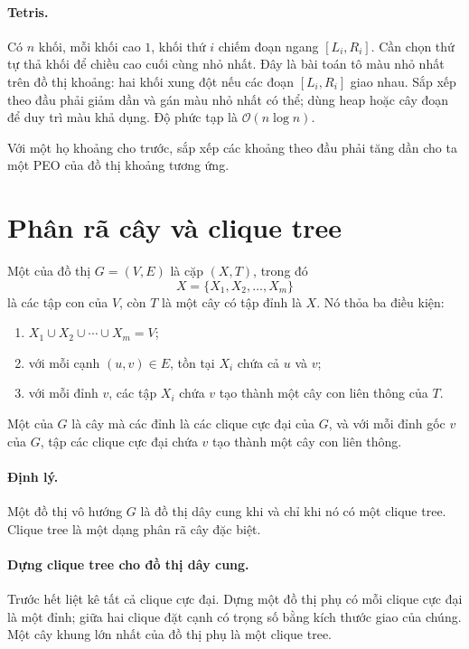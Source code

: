 \documentclass[11pt]{article}
\newcommand{\Oh}{\mathcal{O}}
\begin{document}
\paragraph{Tetris.}
Có \(n\) khối, mỗi khối cao \(1\), khối thứ \(i\) chiếm đoạn ngang
\([L_i,R_i]\). Cần chọn thứ tự thả khối để chiều cao cuối cùng nhỏ nhất. Đây
là bài toán tô màu nhỏ nhất trên đồ thị khoảng: hai khối xung đột nếu các
đoạn \([L_i,R_i]\) giao nhau. Sắp xếp theo đầu phải giảm dần và gán màu nhỏ
nhất có thể; dùng heap hoặc cây đoạn để duy trì màu khả dụng. Độ phức tạp là
\(\Oh(n\log n)\).

Với một họ khoảng cho trước, sắp xếp các khoảng theo đầu phải tăng dần cho ta
một PEO của đồ thị khoảng tương ứng.

\section{Phân rã cây và clique tree}

Một  của đồ thị \(G=(V,E)\) là cặp \((X,T)\), trong đó
\[
  X=\{X_1,X_2,\ldots,X_m\}
\]
là các tập con của \(V\), còn \(T\) là một cây có tập đỉnh là \(X\). Nó thỏa
ba điều kiện:
\begin{enumerate}
  \item \(X_1\cup X_2\cup\cdots\cup X_m=V\);
  \item với mỗi cạnh \((u,v)\in E\), tồn tại \(X_i\) chứa cả \(u\) và \(v\);
  \item với mỗi đỉnh \(v\), các tập \(X_i\) chứa \(v\) tạo thành một cây con
  liên thông của \(T\).
\end{enumerate}

Một  của \(G\) là cây mà các đỉnh là các clique cực đại của
\(G\), và với mỗi đỉnh gốc \(v\) của \(G\), tập các clique cực đại chứa \(v\)
tạo thành một cây con liên thông.

\paragraph{Định lý.}
Một đồ thị vô hướng \(G\) là đồ thị dây cung khi và chỉ khi nó có một clique
tree. Clique tree là một dạng phân rã cây đặc biệt.

\paragraph{Dựng clique tree cho đồ thị dây cung.}
Trước hết liệt kê tất cả clique cực đại. Dựng một đồ thị phụ có mỗi clique
cực đại là một đỉnh; giữa hai clique đặt cạnh có trọng số bằng kích thước
giao của chúng. Một cây khung lớn nhất của đồ thị phụ là một clique tree.
\end{document}
